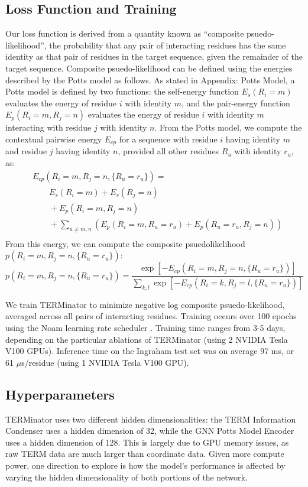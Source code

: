 \documentclass{article}
\begin{document}
\subsection*{Loss Function and Training}
Our loss function is derived from a quantity known as ``composite psuedo-likelihood'', the probability that any pair of interacting residues has the same identity as that pair of residues in the target sequence, given the remainder of the target sequence. Composite psuedo-likelihood can be defined using the energies described by the Potts model as follows. As stated in Appendix: Potts Model, a Potts model is defined by two functions: the self-energy function $E_s(R_i = m)$ evaluates the energy of residue $i$ with identity $m$, and the pair-energy function $E_p(R_i = m, R_j = n)$ evaluates the energy of residue $i$ with identity $m$ interacting with residue $j$ with identity $n$. From the Potts model, we compute the contextual pairwise energy $E_{cp}$ for a sequence with residue $i$ having identity $m$ and residue $j$ having identity $n$, provided all other residues $R_u$ with identity $r_u$, as:
\begin{align*}
    &E_{cp}(R_i=m, R_j=n, \{R_u = r_u\}) =  \\
                        &\quad\quad E_s(R_i=m) + E_s(R_j=n)\\
                        &\quad\quad + E_p(R_i=m, R_j=n)\\
                        &\quad\quad + \sum_{u \neq m,n} \left( E_p(R_i=m, R_u=r_u) + E_p(R_u = r_u, R_j=n) \right)\\
\end{align*}
From this energy, we can compute the composite psuedolikelihood $p(R_i = m, R_j = n, \{R_u = r_u\})$:
$$ p(R_i = m, R_j = n, \{R_u = r_u\}) = \frac{\exp[-E_{cp}(R_i=m, R_j=n, \{R_u = r_u\})]}{\sum_{k,l} \exp[-E_{cp}(R_i=k, R_j=l, \{R_u = r_u\})]}$$

We train TERMinator to minimize negative log composite psuedo-likelihood, averaged across all pairs of interacting residues. Training occurs over 100 epochs using the Noam learning rate scheduler \citep{Vaswani2017}. Training time ranges from 3-5 days, depending on the particular ablations of TERMinator (using 2 NVIDIA Tesla V100 GPUs). Inference time on the Ingraham test set was on average 97 ms, or 61 $\mu$s/residue (using 1 NVIDIA Tesla V100 GPU).


\subsection*{Hyperparameters}
TERMinator uses two different hidden dimensionalities: the TERM Information Condenser uses a hidden dimension of 32, while the GNN Potts Model Encoder uses a hidden dimension of 128. This is largely due to GPU memory issues, as raw TERM data are much larger than coordinate data. Given more compute power, one direction to explore is how the model's performance is affected by varying the hidden dimensionality of both portions of the network.
\end{document}
